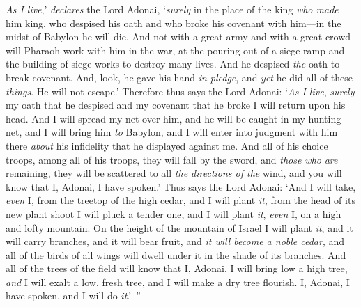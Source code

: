 \begin{biblechapter}
\verse \textit{As I live},’ \textit{declares} the Lord Adonai, ‘\textit{surely} in the place of the king \textit{who made} him king, who despised his oath and who broke his covenant with him—in the midst of Babylon he will die.
\verse And not with a great army and with a great crowd will Pharaoh work with him in the war, at the pouring out of a siege ramp and the building of siege works to destroy many lives.
\verse And he despised \textit{the} oath to break covenant. And, look, he gave his hand \textit{in pledge}, and \textit{yet} he did all of these \textit{things}. He will not escape.’
\verse Therefore thus says the Lord Adonai: ‘\textit{As I live}, \textit{surely} my oath that he despised and my covenant that he broke I will return upon his head.
\verse And I will spread my net over him, and he will be caught in my hunting net, and I will bring him \textit{to} Babylon, and I will enter into judgment with him there \textit{about} his infidelity that he displayed against me.
\verse And all of his choice troops, among all of his troops, they will fall by the sword, and \textit{those who} \textit{are} remaining, they will be scattered to all \textit{the directions of the} wind, and you will know that I, Adonai, I have spoken.’
\verse Thus says the Lord Adonai: ‘And I will take, \textit{even} I, from the treetop of the high cedar, and I will plant \textit{it}, from the head of its new plant shoot I will pluck a tender one, and I will plant \textit{it}, \textit{even} I, on a high and lofty mountain.
\verse On the height of the mountain of Israel I will plant \textit{it}, and it will carry branches, and it will bear fruit, and \textit{it will become a noble cedar}, and all of the birds of all wings will dwell under it in the shade of its branches.
\verse And all of the trees of the field will know that I, Adonai, I will bring low a high tree, \textit{and} I will exalt a low, fresh tree, and I will make a dry tree flourish. I, Adonai, I have spoken, and I will do \textit{it}.’ ”
\end{biblechapter}

